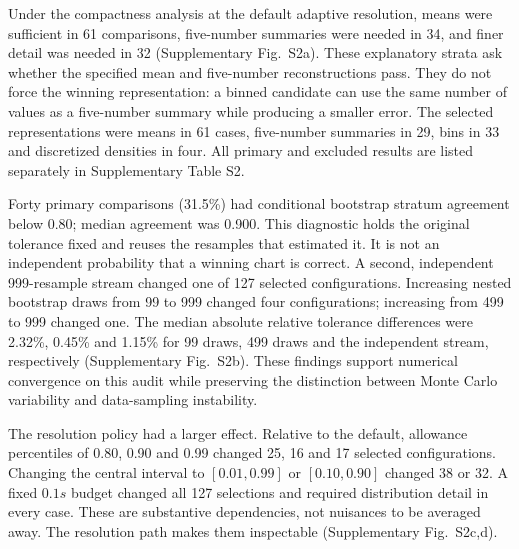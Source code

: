 \documentclass[11pt]{article}
\begin{document}
Under the compactness analysis at the default adaptive resolution, means were sufficient in 61 comparisons, five-number summaries were needed in 34, and finer detail was needed in 32 (Supplementary Fig.~S2a). These explanatory strata ask whether the specified mean and five-number reconstructions pass. They do not force the winning representation: a binned candidate can use the same number of values as a five-number summary while producing a smaller error. The selected representations were means in 61 cases, five-number summaries in 29, bins in 33 and discretized densities in four. All primary and excluded results are listed separately in Supplementary Table S2.

Forty primary comparisons (31.5\%) had conditional bootstrap stratum agreement below 0.80; median agreement was 0.900. This diagnostic holds the original tolerance fixed and reuses the resamples that estimated it. It is not an independent probability that a winning chart is correct. A second, independent 999-resample stream changed one of 127 selected configurations. Increasing nested bootstrap draws from 99 to 999 changed four configurations; increasing from 499 to 999 changed one. The median absolute relative tolerance differences were 2.32\%, 0.45\% and 1.15\% for 99 draws, 499 draws and the independent stream, respectively (Supplementary Fig.~S2b). These findings support numerical convergence on this audit while preserving the distinction between Monte Carlo variability and data-sampling instability.

The resolution policy had a larger effect. Relative to the default, allowance percentiles of 0.80, 0.90 and 0.99 changed 25, 16 and 17 selected configurations. Changing the central interval to $[0.01,0.99]$ or $[0.10,0.90]$ changed 38 or 32. A fixed $0.1s$ budget changed all 127 selections and required distribution detail in every case. These are substantive dependencies, not nuisances to be averaged away. The resolution path makes them inspectable (Supplementary Fig.~S2c,d).
\end{document}
